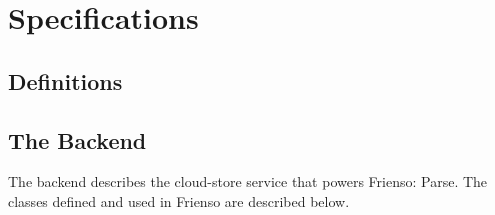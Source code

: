 %
%
%
%  
%
%
%
%

\chapter{Specifications}

\begin{introduction}  
\end{introduction}

\section{Definitions}

\section{The Backend}
  The backend describes the cloud-store service that powers Frienso: Parse.  The classes 
  defined and used in Frienso are described below.
  
